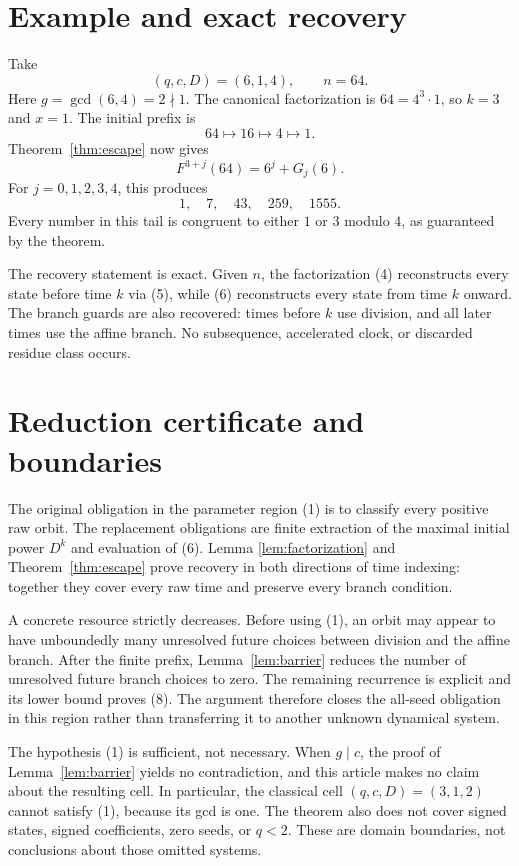 \documentclass[11pt,letterpaper]{article}
\begin{document}
\section{Example and exact recovery}

Take
\[
(q,c,D)=(6,1,4),
\qquad
n=64.
\]
Here \(g=\gcd(6,4)=2\nmid1\). The canonical factorization is
\(64=4^3\cdot1\), so \(k=3\) and \(x=1\). The initial prefix is
\[
64\longmapsto16\longmapsto4\longmapsto1.
\]
Theorem~\ref{thm:escape} now gives
\[
F^{3+j}(64)=6^j+G_j(6).
\]
For \(j=0,1,2,3,4\), this produces
\[
1,
\quad 7,
\quad 43,
\quad 259,
\quad 1555.
\]
Every number in this tail is congruent to either \(1\) or \(3\) modulo
\(4\), as guaranteed by the theorem.

The recovery statement is exact. Given \(n\), the factorization (4)
reconstructs every state before time \(k\) via (5), while (6) reconstructs
every state from time \(k\) onward. The branch guards are also recovered:
times before \(k\) use division, and all later times use the affine branch.
No subsequence, accelerated clock, or discarded residue class occurs.

\section{Reduction certificate and boundaries}

The original obligation in the parameter region (1) is to classify every
positive raw orbit. The replacement obligations are finite extraction of the
maximal initial power \(D^k\) and evaluation of (6). Lemma
\ref{lem:factorization} and Theorem~\ref{thm:escape} prove recovery in both
directions of time indexing: together they cover every raw time and preserve
every branch condition.

A concrete resource strictly decreases. Before using (1), an orbit may appear
to have unboundedly many unresolved future choices between division and the
affine branch. After the finite prefix, Lemma~\ref{lem:barrier} reduces the
number of unresolved future branch choices to zero. The remaining recurrence
is explicit and its lower bound proves (8). The argument therefore closes the
all-seed obligation in this region rather than transferring it to another
unknown dynamical system.

The hypothesis (1) is sufficient, not necessary. When \(g\mid c\), the proof
of Lemma~\ref{lem:barrier} yields no contradiction, and this article makes no
claim about the resulting cell. In particular, the classical cell
\((q,c,D)=(3,1,2)\) cannot satisfy (1), because its gcd is one. The theorem
also does not cover signed states, signed coefficients, zero seeds, or
\(q<2\). These are domain boundaries, not conclusions about those omitted
systems.



\end{document}
